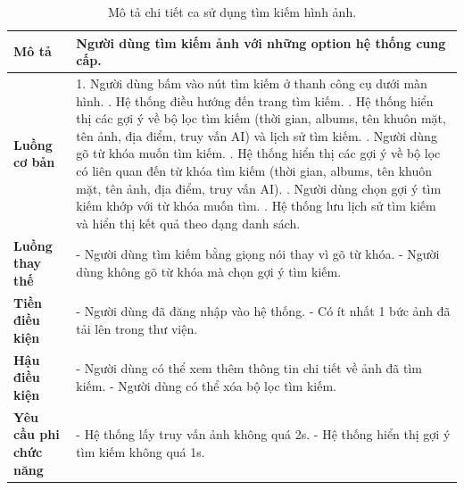 \noindent 
\begin{table}[H]
\centering
\begin{tabularx}{\linewidth}{| l | X |} 
\hline 
\textbf{Mô tả} & Người dùng tìm kiếm ảnh với những option hệ thống cung cấp. \\
\hline 
\textbf{Luồng cơ bản} & 1. Người dùng bấm vào nút tìm kiếm ở thanh công cụ dưới màn hình. \newline
                       2. Hệ thống điều hướng đến trang tìm kiếm. \newline
                       3. Hệ thống hiển thị các gợi ý về bộ lọc tìm kiếm (thời gian, albums, tên khuôn mặt, tên ảnh, địa điểm, truy vấn AI) và lịch sử tìm kiếm. \newline
                       4. Người dùng gõ từ khóa muốn tìm kiếm. \newline
                       5. Hệ thống hiển thị các gợi ý về bộ lọc có liên quan đến từ khóa tìm kiếm (thời gian, albums, tên khuôn mặt, tên ảnh, địa điểm, truy vấn AI). \newline
                       6. Người dùng chọn gợi ý tìm kiếm khớp với từ khóa muốn tìm. \newline
                       7. Hệ thống lưu lịch sử tìm kiếm và hiển thị kết quả theo dạng danh sách. \\
\hline
\textbf{Luồng thay thế} & - Người dùng tìm kiếm bằng giọng nói thay vì gõ từ khóa. \newline
                           - Người dùng không gõ từ khóa mà chọn gợi ý tìm kiếm. \\
\hline
\textbf{Tiền điều kiện} & - Người dùng đã đăng nhập vào hệ thống. \newline
                          - Có ít nhất 1 bức ảnh đã tải lên trong thư viện. \\
\hline
\textbf{Hậu điều kiện} & - Người dùng có thể xem thêm thông tin chi tiết về ảnh đã tìm kiếm. \newline
                          - Người dùng có thể xóa bộ lọc tìm kiếm. \\
\hline 
\textbf{Yêu cầu phi chức năng} & - Hệ thống lấy truy vấn ảnh không quá 2s. \newline
                            - Hệ thống hiển thị gợi ý tìm kiếm không quá 1s. \\
\hline 
\end{tabularx}
\caption{Mô tả chi tiết ca sử dụng tìm kiếm hình ảnh.}
\label{tab:search-image-usecase}
\end{table}


